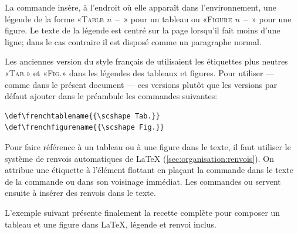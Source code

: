 La commande \cmd{\caption} insère,  à l'endroit où elle
apparaît dans l'environnement, une légende de la forme «\textsc{Table}
\emph{n}~--~» pour un tableau ou «\textsc{Figure}
\emph{n}~--~» pour une figure. Le texte de la légende est
centré sur la page lorsqu'il fait moins d'une ligne; dans le cas
contraire il est disposé comme un paragraphe normal.

\begin{conseil}
  Les anciennes version du style français de  utilisaient
  les étiquettes plus neutres «\textsc{Tab.}» et «\textsc{Fig.}» dans
  les légendes des tableaux et figures. Pour utiliser --- comme dans
  le présent document --- ces versions plutôt que les versions par
  défaut ajouter dans le préambule les commandes suivantes:
\begin{lstlisting}
\def\frenchtablename{{\scshape Tab.}}
\def\frenchfigurename{{\scshape Fig.}}
\end{lstlisting}
\end{conseil}

Pour faire référence à un tableau ou à une figure dans le texte, il
faut utiliser le système de renvois automatiques de {\LaTeX}
(\autoref{sec:organisation:renvois}). On attribue une étiquette à l'élément
flottant en plaçant la commande \cmd{\label} dans le texte de la
commande \cmd{\caption} ou dans son voisinage immédiat. Les commandes
\cmd{\ref} ou \cmd{\autoref} servent ensuite à insérer des renvois dans
le texte.

L'exemple suivant présente finalement la recette complète pour composer
un tableau et une figure dans {\LaTeX}, légende et renvoi inclus.


